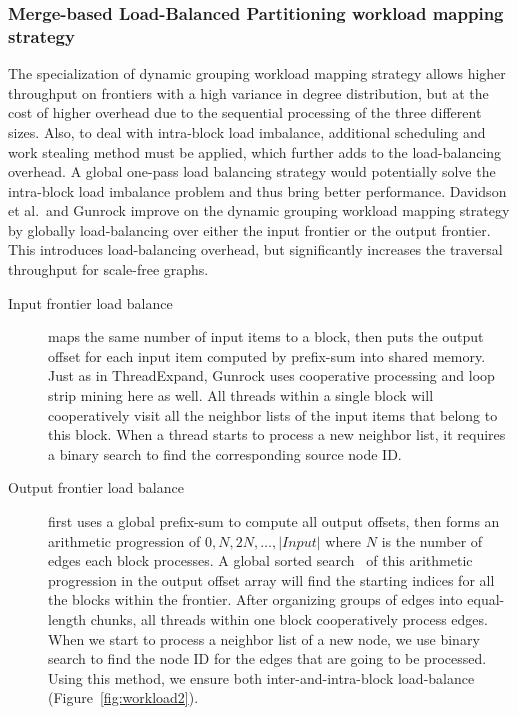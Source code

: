 \documentclass[format=acmsmall,review=false,screen=true]{acmart}
\begin{document}
\subsubsection{Merge-based Load-Balanced Partitioning workload mapping strategy}
\label{subsubsec:lb}
The specialization of dynamic grouping workload mapping strategy
allows higher throughput on frontiers with a high variance in degree
distribution, but at the cost of higher overhead due to the sequential
processing of the three different sizes. Also, to deal with
intra-block load imbalance, additional scheduling and work stealing
method must be applied, which further adds to the load-balancing
overhead. A global one-pass load balancing strategy would potentially
solve the intra-block load imbalance problem and thus bring better
performance. Davidson et al.\ and Gunrock improve on the dynamic
grouping workload mapping strategy by globally load-balancing over
either the input frontier or the output frontier. This introduces
load-balancing overhead, but significantly increases the traversal
throughput for scale-free graphs.
\begin{description}
\item[Input frontier load balance] maps the same number of input items
  to a block, then puts the output offset for each input item computed
  by prefix-sum into shared memory. Just as in ThreadExpand, Gunrock
  uses cooperative processing and loop strip mining here as well. All
  threads within a single block will cooperatively visit all the
  neighbor lists of the input items that belong to this block. When a
  thread starts to process a new neighbor list, it requires a binary
  search to find the corresponding source node ID\@.
\item[Output frontier load balance] first uses a global prefix-sum
  to compute all output offsets, then forms an arithmetic
  progression of $0, N, 2N, \ldots, |\textit{Input}|$ where $N$ is the
  number of edges each block processes. A global sorted
  search~\cite{MGPU:2016} of this arithmetic progression in the output
  offset array will find the starting indices for all the blocks
  within the frontier. After organizing groups of edges into
  equal-length chunks, all threads within one block cooperatively
  process edges. When we start to process a neighbor list of a new
  node, we use binary search to find the node ID for the edges that
  are going to be processed. Using this method, we ensure both
  inter-and-intra-block load-balance (Figure~\ref{fig:workload2}).
\end{description}
\end{document}
